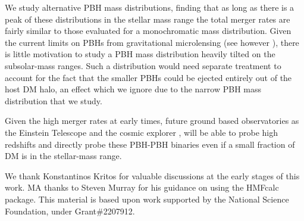 \documentclass[aps, prd, reprint, nofootinbib]{revtex4-2}
\begin{document}
We study alternative PBH mass distributions, finding that as long as there is a peak of these distributions in the stellar mass range the total merger rates are fairly similar to those evaluated for a monochromatic mass distribution. 
Given the current limits on PBHs from gravitational microlensing \cite{Blaineau:2022nhy, Mroz:2024mse} (see however \cite{Garcia-Bellido:2024yaz}), there is little motivation to study a PBH mass distribution heavily tilted on the subsolar-mass ranges. 
Such a distribution would need separate treatment to account for the fact that the smaller PBHs could be ejected entirely out of the host DM halo, an effect which we ignore due to the narrow PBH mass distribution that we study.

Given the high merger rates at early times, future ground based observatories as the Einstein Telescope \cite{Hild:2010id} and the cosmic explorer \cite{Evans:2023euw, Gupta:2023lga}, will be able to probe high redshifts and directly probe these PBH-PBH binaries even if a small fraction of DM is in the stellar-mass range.

\begin{acknowledgments}
We thank Konstantinos Kritos for valuable discussions at the early stages of this work. MA thanks to Steven Murray for his guidance on using the HMFcalc package. This material is based upon work supported by the National Science Foundation, under Grant$\#$2207912. 
\end{acknowledgments}
\end{document}
